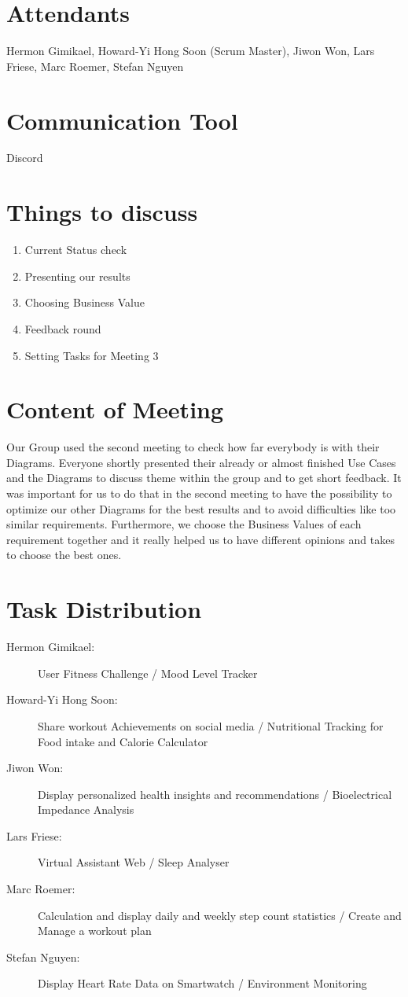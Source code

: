 \documentclass{article}
\begin{document}
\section*{Attendants}
Hermon Gimikael, Howard-Yi Hong Soon (Scrum Master), Jiwon Won, Lars Friese, Marc Roemer, Stefan Nguyen

\section*{Communication Tool}
Discord

\section*{Things to discuss}
\begin{enumerate}
    \item Current Status check
    \item Presenting our results
    \item Choosing Business Value 
    \item Feedback round
    \item Setting Tasks for Meeting 3
\end{enumerate}

\section*{Content of Meeting}
Our Group used the second meeting to check how far everybody is with their Diagrams. Everyone shortly presented their already or almost finished Use Cases and the Diagrams to discuss theme within the group and to get short feedback. It was important for us to do that in the second meeting to have the possibility to optimize our other Diagrams for the best results and to avoid difficulties like too similar requirements. Furthermore, we choose the Business Values of each requirement together and it really helped us to have different opinions and takes to choose the best ones. 

\section*{Task Distribution}
\begin{description}
    \item[Hermon Gimikael:] User Fitness Challenge / Mood Level Tracker
    \item[Howard-Yi Hong Soon:] Share workout Achievements on social media / Nutritional Tracking for Food intake and Calorie Calculator
    \item[Jiwon Won:] Display personalized health insights and recommendations / Bioelectrical Impedance Analysis
    \item[Lars Friese:] Virtual Assistant Web / Sleep Analyser
    \item[Marc Roemer:] Calculation and display daily and weekly step count statistics / Create and Manage a workout plan
    \item[Stefan Nguyen:] Display Heart Rate Data on Smartwatch / Environment Monitoring
\end{description}
\end{document}
